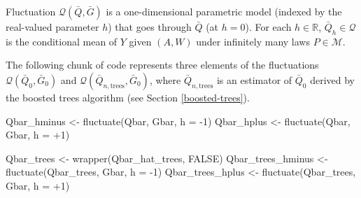 \documentclass[
  11pt,
  openright,twoside]{book}
\newenvironment{Shaded}{\begin{snugshade}}{\end{snugshade}}
\newcommand{\AttributeTok}[1]{\textcolor[rgb]{0.77,0.63,0.00}{#1}}
\newcommand{\ConstantTok}[1]{\textcolor[rgb]{0.00,0.00,0.00}{#1}}
\newcommand{\DecValTok}[1]{\textcolor[rgb]{0.00,0.00,0.81}{#1}}
\newcommand{\FunctionTok}[1]{\textcolor[rgb]{0.00,0.00,0.00}{#1}}
\newcommand{\NormalTok}[1]{#1}
\newcommand{\OtherTok}[1]{\textcolor[rgb]{0.56,0.35,0.01}{#1}}
\newcommand{\SpecialCharTok}[1]{\textcolor[rgb]{0.00,0.00,0.00}{#1}}
\newcommand{\bbR}{\mathbb{R}}
\newcommand{\calM}{\mathcal{M}}
\newcommand{\calQ}{\mathcal{Q}}
\newcommand{\Gbar}{\bar{G}}
\newcommand{\Qbar}{\bar{Q}}
\theoremstyle{definition}
\theoremstyle{definition}
\theoremstyle{definition}
\theoremstyle{definition}
\theoremstyle{remark}
\begin{document}
Fluctuation \(\calQ(\Qbar,\Gbar)\) is a one-dimensional parametric model
(indexed by the real-valued parameter \(h\)) that goes through \(\Qbar\) (at
\(h=0\)). For each \(h \in \bbR\), \(\Qbar_{h} \in \calQ\) is the conditional mean
of \(Y\) given \((A,W)\) under infinitely many laws \(P \in \calM\).

The following chunk of code represents three elements of the fluctuations
\(\calQ(\Qbar_{0}, \Gbar_{0})\) and \(\calQ(\Qbar_{n,\text{trees}}, \Gbar_{0})\),
where \(\Qbar_{n,\text{trees}}\) is an estimator of \(\Qbar_{0}\) derived by the
boosted trees algorithm (see Section \ref{boosted-trees}).



\begin{Shaded}
\begin{Highlighting}[]
\NormalTok{Qbar\_hminus }\OtherTok{\textless{}{-}} \FunctionTok{fluctuate}\NormalTok{(Qbar, Gbar, }\AttributeTok{h =} \SpecialCharTok{{-}}\DecValTok{1}\NormalTok{)}
\NormalTok{Qbar\_hplus }\OtherTok{\textless{}{-}} \FunctionTok{fluctuate}\NormalTok{(Qbar, Gbar, }\AttributeTok{h =} \SpecialCharTok{+}\DecValTok{1}\NormalTok{)}

\NormalTok{Qbar\_trees }\OtherTok{\textless{}{-}} \FunctionTok{wrapper}\NormalTok{(Qbar\_hat\_trees, }\ConstantTok{FALSE}\NormalTok{)}
\NormalTok{Qbar\_trees\_hminus }\OtherTok{\textless{}{-}} \FunctionTok{fluctuate}\NormalTok{(Qbar\_trees, Gbar, }\AttributeTok{h =} \SpecialCharTok{{-}}\DecValTok{1}\NormalTok{)}
\NormalTok{Qbar\_trees\_hplus }\OtherTok{\textless{}{-}} \FunctionTok{fluctuate}\NormalTok{(Qbar\_trees, Gbar, }\AttributeTok{h =} \SpecialCharTok{+}\DecValTok{1}\NormalTok{)}


\end{Highlighting}
\end{Shaded}
\end{document}
